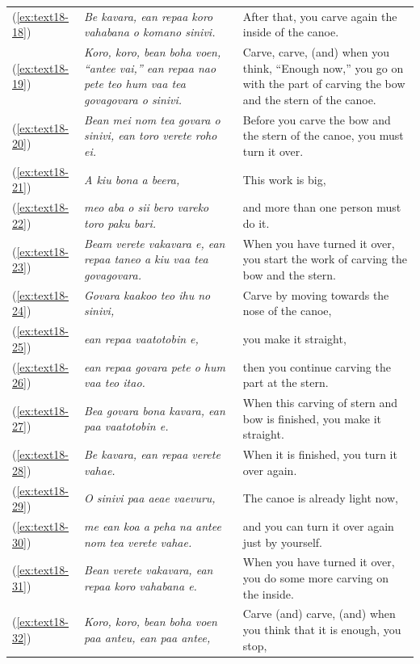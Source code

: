 \documentclass[output=paper]{langscibook}
\begin{document}
\begin{xltabular}{\textwidth}{lXX}
	(\ref{ex:text18-18})&\textit{Be kavara, ean repaa koro vahabana o komano sinivi.}&After that, you carve again the inside of the canoe.\\
    (\ref{ex:text18-19})&\textit{Koro, koro, bean boha voen, ``antee vai,'' ean repaa nao pete teo hum vaa tea govagovara o sinivi.}&Carve, carve, (and) when you think, ``Enough now,'' you go on with the part of carving the bow and the stern of the canoe.\\
	(\ref{ex:text18-20})&\textit{Bean mei nom tea govara o sinivi, ean toro verete roho ei.}&Before you carve the bow and the stern of the canoe, you must turn it over.\\
	(\ref{ex:text18-21})&\textit{A kiu bona a beera,}&This work is big,\\
	(\ref{ex:text18-22})&\textit{meo aba o sii bero vareko toro paku bari.}&and more than one person must do it.\\
	(\ref{ex:text18-23})&\textit{Beam verete vakavara e, ean repaa taneo a kiu vaa tea govagovara.}&When you have turned it over, you start the work of carving the bow and the stern.\\
	(\ref{ex:text18-24})&\textit{Govara kaakoo teo ihu no sinivi,}&Carve by moving towards the nose of the canoe,\\
	(\ref{ex:text18-25})&\textit{ean repaa vaatotobin e,}&you make it straight,\\
	(\ref{ex:text18-26})&\textit{ean repaa govara pete o hum vaa teo itao.}&then you continue carving the part at the stern.\\
	(\ref{ex:text18-27})&\textit{Bea govara bona kavara, ean paa vaatotobin e.}&When this carving of stern and bow is finished, you make it straight.\\
	(\ref{ex:text18-28})&\textit{Be kavara, ean repaa verete vahae.}&When it is finished, you turn it over again.\\
	(\ref{ex:text18-29})&\textit{O sinivi paa aeae vaevuru,}&The canoe is already light now,\\
	(\ref{ex:text18-30})&\textit{me ean koa a peha na antee nom tea verete vahae.}&and you can turn it over again just by yourself.\\
	(\ref{ex:text18-31})&\textit{Bean verete vakavara, ean repaa koro vahabana e.}&When you have turned it over, you do some more carving on the inside.\\
	(\ref{ex:text18-32})&\textit{Koro, koro, bean boha voen paa anteu, ean paa antee,}&Carve (and) carve, (and) when you think that it is enough, you stop,\\

\end{xltabular}
\end{document}
